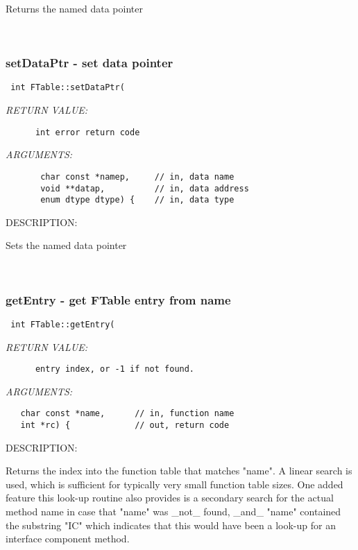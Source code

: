       Returns the named data pointer
   
 
\mbox{}\hrulefill\
 
\subsubsection [setDataPtr] {setDataPtr - set data pointer}


  
\begin{verbatim} int FTable::setDataPtr(\end{verbatim}{\em RETURN VALUE:}
\begin{verbatim}      int error return code\end{verbatim}{\em ARGUMENTS:}
\begin{verbatim}       char const *namep,     // in, data name
       void **datap,          // in, data address
       enum dtype dtype) {    // in, data type\end{verbatim}
{\sf DESCRIPTION:\\ }


      Sets the named data pointer
   
 
\mbox{}\hrulefill\
 
\subsubsection [getEntry] {getEntry - get FTable entry from name}


  
\begin{verbatim} int FTable::getEntry(\end{verbatim}{\em RETURN VALUE:}
\begin{verbatim}      entry index, or -1 if not found.\end{verbatim}{\em ARGUMENTS:}
\begin{verbatim}   char const *name,      // in, function name
   int *rc) {             // out, return code\end{verbatim}
{\sf DESCRIPTION:\\ }


    Returns the index into the function table that matches "name". A linear
    search is used, which is sufficient for typically very small function
    table sizes.
    One added feature this look-up routine also provides is a secondary
    search for the actual method name in case that "name" was _not_ found,
    _and_ "name" contained the substring "IC" which indicates that this
    would have been a look-up for an interface component method.
   
